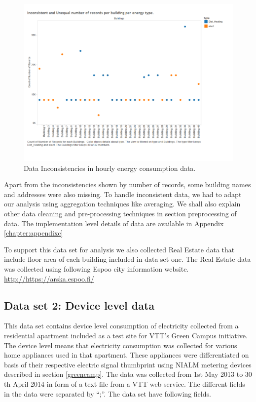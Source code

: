 \begin{figure}[!ht]
    \begin{center}
      \includegraphics[width=\textwidth]{images/incon.pdf}
      \caption{Data Inconsistencies in hourly energy consumption data.}
      \label{fig:incon}
    \end{center}
  \end{figure} 
Apart from the inconsistencies shown by number of records, some building names and addresses were also missing. To handle inconsistent data, we had to adapt our analysis using aggregation techniques like averaging. We shall also explain other data cleaning and pre-processing techniques in section preprocessing of data. The implementation level details of data are available in Appendix \ref{chapter:appendixc}

To support this data set for analysis we also collected Real Estate data that include floor area of each building included in data set one. The Real Estate data was collected using following Espoo city information website.
\url{http://https://arska.espoo.fi/}


\subsection{Data set 2: Device level data}
This data set contains device level consumption of electricity collected from a residential apartment included as a test site for VTT's Green Campus initiative. The device level means that electricity  consumption  was collected for various home appliances used in that apartment. These appliances were differentiated on basis of their respective electric signal thumbprint using NIALM metering devices described in section \ref{greencamp}. The data was collected from 1st May 2013 to 30 th April 2014 in form of a text file from a VTT web service. The different fields in the data were separated by ``;''. The data set have following fields.

